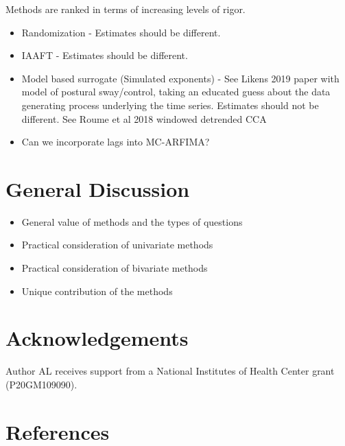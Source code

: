 \documentclass[
  english,
  man]{apa6}
\providecommand{\tightlist}{%
  \setlength{\itemsep}{0pt}\setlength{\parskip}{0pt}}
\begin{document}
Methods are ranked in terms of increasing levels of rigor.

\begin{itemize}
\tightlist
\item
  Randomization - Estimates should be different.
\item
  IAAFT - Estimates should be different.
\item
  Model based surrogate (Simulated exponents) - See Likens 2019 paper
  with model of postural sway/control, taking an educated guess about
  the data generating process underlying the time series. Estimates
  should not be different. See Roume et al 2018 windowed detrended CCA
\item
  Can we incorporate lags into MC-ARFIMA?
\end{itemize}

\hypertarget{general-discussion}{%
\section{General Discussion}\label{general-discussion}}

\begin{itemize}
\tightlist
\item
  General value of methods and the types of questions
\item
  Practical consideration of univariate methods
\item
  Practical consideration of bivariate methods
\item
  Unique contribution of the methods
\end{itemize}

\hypertarget{acknowledgements}{%
\section{Acknowledgements}\label{acknowledgements}}

Author AL receives support from a National Institutes of Health Center
grant (P20GM109090).

\newpage

\hypertarget{references}{%
\section{References}\label{references}}

\begingroup
\setlength{\parindent}{-0.5in}
\setlength{\leftskip}{0.5in}
\end{document}
